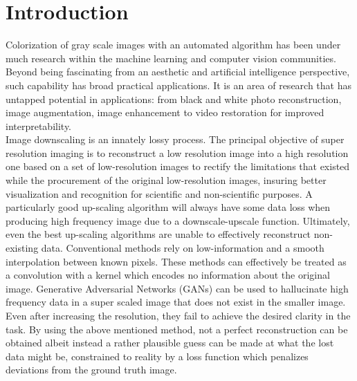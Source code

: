 \documentclass[10pt,twocolumn,letterpaper]{article}
\begin{document}
\section{Introduction}
\label{sec:intro}
Colorization of gray scale images with an automated algorithm has been under much research within the machine learning and computer vision communities. Beyond being fascinating from an aesthetic and artificial intelligence perspective, such capability has broad practical applications. It is an area of research that has untapped potential in applications: from black and white photo reconstruction, image augmentation, image enhancement to video restoration for improved interpretability. \\
\hspace*{0.167 in}Image downscaling is an innately lossy process. The principal objective of super resolution imaging is to reconstruct a low resolution image into a high resolution one based on a set of low-resolution images to rectify the limitations that existed while the procurement of the original low-resolution images, insuring better visualization and recognition for scientific and non-scientific purposes. A particularly good up-scaling algorithm will always have some data loss when producing high frequency image due to a downscale-upscale function. Ultimately, even the best up-scaling algorithms are unable to effectively reconstruct non-existing data. Conventional methods rely on low-information and a smooth interpolation between known pixels. These methods can effectively be treated as a convolution with a kernel which encodes no information about the original image. Generative Adversarial Networks (GANs) can be used to hallucinate high frequency data in a super scaled image that does not exist in the smaller image. Even after increasing the resolution, they fail to achieve the desired clarity in the task. By using the above mentioned method, not a perfect reconstruction can be obtained albeit instead a rather plausible guess can be made at what the lost data might be, constrained to reality by a loss function which penalizes deviations from the ground truth image.\\
\end{document}
